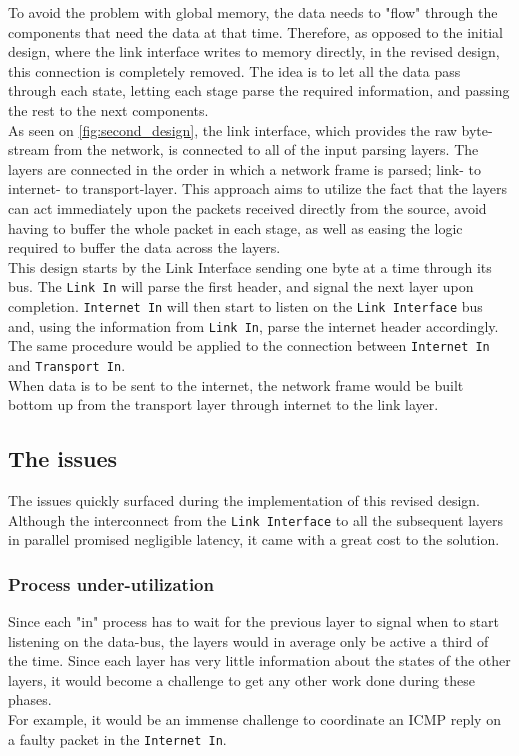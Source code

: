 To avoid the problem with global memory, the data needs to "flow" through the
components that need the data at that time. Therefore, as opposed to the initial
design, where the link interface writes to memory directly, in the revised design,
this connection is completely removed. The idea is to let all the data
pass through each state, letting each stage parse the required information, and
passing the rest to the next components.\\
As seen on \autoref{fig:second_design}, the link interface, which
provides the raw byte-stream from the network, is connected to all of the input
parsing layers. The layers are connected in the order in which a network frame
is parsed; link- to internet- to transport-layer. This approach aims to utilize
the fact that the layers can act immediately upon the packets received directly
from the source, avoid having to buffer the whole packet in each stage, as well
as easing the logic required to buffer the data across the layers.\\
This design starts by the Link Interface sending one byte at a time through its bus.
The \texttt{Link In} will parse the first header, and signal the next layer upon completion.
\texttt{Internet In} will then start to listen on the \texttt{Link Interface} bus
and, using the information from \texttt{Link In}, parse the internet header
accordingly. The same procedure would be applied to the connection between
\texttt{Internet In} and \texttt{Transport In}.\\
When data is to be sent to the internet, the network frame would be built bottom
up from the transport layer through internet to the link layer.

\subsection{The issues}
The issues quickly surfaced during the implementation of this revised design. Although
the interconnect from the \texttt{Link Interface} to all the subsequent layers
in parallel promised negligible latency, it came with a great cost to the solution.

\subsubsection{Process under-utilization} \label{item:process_utilization}
Since each "in" process has to wait for the previous layer to signal when to
start listening on the data-bus, the layers would in average only be active a third
of the time. Since each layer has very little information about the states of
the other layers, it would become a challenge to get any other work done during
these phases.\\
For example, it would be an immense challenge to coordinate an ICMP reply on a
faulty packet in the \texttt{Internet In}.

